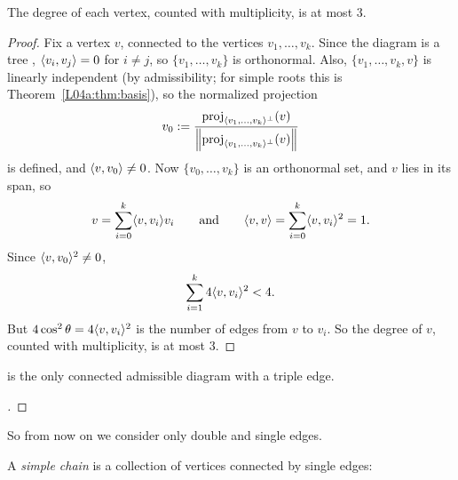 \begin{lemma}\label{L04a:lem:degree}
The degree of each vertex, counted with multiplicity, is at most $3$.
\end{lemma}

\begin{proof}
Fix a vertex $v$, connected to the vertices $v_1,\dots,v_k$.
Since the diagram is a tree , $\langle v_i, v_j\rangle=0$ for $i\neq j$, so $\{v_1,\dots,v_k\}$ is orthonormal. Also,
$\{v_1,\dots,v_k,v\}$ is linearly independent (by admissibility; for simple roots this is Theorem~\ref{L04a:thm:basis}), so
the normalized projection
\[
  v_0 := \frac{\operatorname{proj}_{\langle v_1,\dots,v_k\rangle^\perp}(v)}{\left\lVert \operatorname{proj}_{\langle v_1,\dots,v_k\rangle^\perp}(v) \right\rVert}
\]
is defined, and $\langle v, v_0\rangle\neq0$. Now $\{v_0,\dots,v_k\}$ is an orthonormal set, and $v$ lies in its
span, so
\[
  v=\sum_{i=0}^k\langle v, v_i\rangle v_i \qquad\text{and}\qquad \langle v, v\rangle=\sum_{i=0}^k\langle v, v_i\rangle^2=1 .
\]
Since $\langle v, v_0\rangle^2\neq0$,
\[
  \sum_{i=1}^k 4\langle v, v_i\rangle^2<4 .
\]
But $4\cos^2\theta = 4\langle v, v_i\rangle^2$ is the number of edges from $v$ to $v_i$. So the degree of $v$,
counted with multiplicity, is at most $3$.
\end{proof}

\begin{corollary}\label{L04a:cor:G2}
 is the only connected admissible diagram with a
triple edge.
\end{corollary}

\begin{proof}[]
\end{proof}

So from now on we consider only double and single edges.

\begin{definition}\label{L04a:def:chain}
A \emph{simple chain} is a collection of vertices connected by single edges:
\begin{center}
\end{center}
\end{definition}

